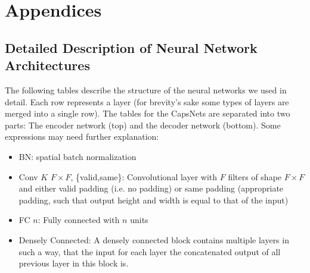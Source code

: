 \appendix
\section*{Appendices}
\renewcommand{\thesubsection}{\Alph{subsection}}

\subsection{Detailed Description of Neural Network Architectures}
\label{lab:networks}

The following tables describe the structure of the neural networks we used in detail. Each row represents a layer (for brevity's sake some types of layers are merged into a single row).
The tables for the CapsNets are separated into two parts: The encoder network (top) and the decoder network (bottom).
Some expressions may need further explanation:

\begin{itemize}
	\item BN: spatial batch normalization
	\item Conv $K$ $F \times F$, \{valid,same\}: Convolutional layer with $F$ filters of shape $F \times F$ and either valid padding (i.e. no padding) or same padding (appropriate padding, such that output height and width is equal to that of the input)
	\item FC $n$: Fully connected with $n$ units
	\item Densely Connected: A densely connected block \citep{denselyconnected} contains multiple layers in such a way, that the input for each layer the concatenated output of all previous layer in this block is.
\end{itemize}


